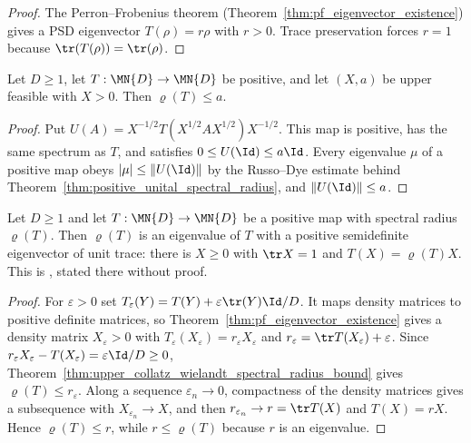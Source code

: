 \begin{proof}\leanok
    The Perron--Frobenius theorem
    (Theorem~\ref{thm:pf_eigenvector_existence}) gives a PSD
    eigenvector $T(\rho)=r\rho$ with $r>0$.  Trace preservation forces
    $r=1$ because $\tr(T(\rho))=\tr(\rho)$.
\end{proof}


\begin{theorem}
    \label{thm:upper_collatz_wielandt_spectral_radius_bound}
    \leanok
    Let $D\geq1$, let $T:\MN{D}\to\MN{D}$ be positive, and let $(X,a)$ be
    upper feasible with $X>0$. Then $\varrho(T)\leq a$.
\end{theorem}

\begin{proof}\leanok
    Put $U(A)=X^{-1/2}T(X^{1/2}AX^{1/2})X^{-1/2}$. This map is positive,
    has the same spectrum as $T$, and satisfies $0\leq U(\Id)\leq a\Id$.
    Every eigenvalue $\mu$ of a positive map obeys $|\mu|\leq\|U(\Id)\|$
    by the Russo--Dye estimate behind
    Theorem~\ref{thm:positive_unital_spectral_radius}, and
    $\|U(\Id)\|\leq a$.
\end{proof}

\begin{theorem}
    \label{thm:wolf_spectral_radius_positive_eigenvector}
    \leanok
    Let $D\geq1$ and let $T:\MN{D}\to\MN{D}$ be a positive map with spectral
    radius $\varrho(T)$. Then $\varrho(T)$ is an eigenvalue of $T$ with a
    positive semidefinite eigenvector of unit trace:
    there is $X\geq0$ with $\tr X=1$ and $T(X)=\varrho(T)X$.
    This is \cite[Theorem~6.5]{Wolf2012Quantum}, stated there without proof.
\end{theorem}

\begin{proof}\leanok
    For $\varepsilon>0$ set
    $T_\varepsilon(Y)=T(Y)+\varepsilon\tr(Y)\Id/D$. It maps density matrices to
    positive definite matrices, so
    Theorem~\ref{thm:pf_eigenvector_existence} gives a density matrix
    $X_\varepsilon>0$ with $T_\varepsilon(X_\varepsilon)=r_\varepsilon X_\varepsilon$
    and $r_\varepsilon=\tr T(X_\varepsilon)+\varepsilon$. Since
    $r_\varepsilon X_\varepsilon-T(X_\varepsilon)=\varepsilon\Id/D\geq0$,
    Theorem~\ref{thm:upper_collatz_wielandt_spectral_radius_bound} gives
    $\varrho(T)\leq r_\varepsilon$. Along a sequence $\varepsilon_n\to0$,
    compactness of the density matrices gives a subsequence with
    $X_{\varepsilon_n}\to X$, and then $r_{\varepsilon_n}\to r=\tr T(X)$ and
    $T(X)=rX$. Hence $\varrho(T)\leq r$, while $r\leq\varrho(T)$ because $r$
    is an eigenvalue.
\end{proof}



